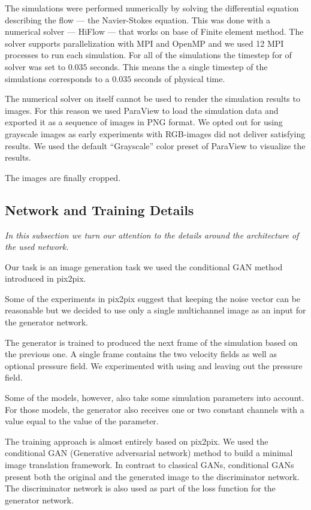 \documentclass{llncs}
\begin{document}
The simulations were performed numerically by solving the differential equation describing the flow --- the Navier-Stokes equation. This was done with a numerical solver --- HiFlow ---  that works on base of Finite element method. The solver supports parallelization with MPI and OpenMP and we used 12 MPI processes to run each simulation. For all of the simulations the timestep for of solver was set to $0.035$ seconds. This means the a single timestep of the simulations corresponds to a $0.035$ seconds of physical time.

The numerical solver on itself cannot be used to render the simulation results to images. For this reason we used ParaView to load the simulation data and exported it as a sequence of images in PNG format. We opted out for using grayscale images as early experiments with RGB-images did not deliver satisfying results. We used the default ``Grayscale'' color preset of ParaView to visualize the results.

The images are finally cropped.

\subsection{Network and Training Details}
\emph{In this subsection we turn our attention to the details around the architecture of the used network.}

Our task is an image generation task we used the conditional GAN method introduced in pix2pix.

Some of the experiments in pix2pix suggest that keeping the noise vector can be reasonable but we decided to use only a single multichannel image as an input for the generator network.

The generator is trained to produced the next frame of the simulation based on the previous one. A single frame contains the two velocity fields as well as optional pressure field. We experimented with using and leaving out the pressure field.

Some of the models, however, also take some simulation parameters into account. For those models, the generator also receives one or two constant channels with a value equal to the value of the parameter.

The training approach is almost entirely based on pix2pix. We used the conditional GAN (Generative adversarial network) method to build a minimal image translation framework. In contrast to classical GANs, conditional GANs present both the original and the generated image to the discriminator network. The discriminator network is also used as part of the loss function for the generator network.
\end{document}
